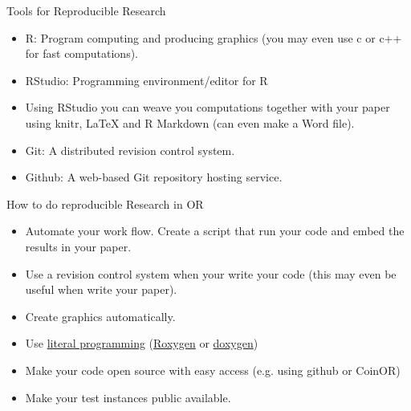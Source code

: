 \documentclass[10pt, compress]{beamer}
\begin{document}
\begin{frame}{Tools for Reproducible Research}

\begin{itemize}[<+->]
\item R: Program computing and producing graphics (you may even use c or c++ for fast computations).
\item RStudio: Programming environment/editor for R
\item Using RStudio you can weave you computations together with your paper using knitr, LaTeX and R Markdown (can even make a Word file).
\item Git: A distributed revision control system.
\item Github: A web-based Git repository hosting service.
\end{itemize}

\end{frame}



\begin{frame}{How to do reproducible Research in OR}

\begin{itemize}[<+->]
\item Automate your work flow. Create a script that run your code and embed the results in your paper. 
\item Use a revision control system when your write your code (this may even be useful when write your paper).
\item Create graphics automatically.
\item Use \href{http://en.wikipedia.org/wiki/Literate_programming}{literal programming} (\href{http://roxygen.org/}{Roxygen} or \href{http://www.doxygen.org/}{doxygen})
\item Make your code open source with easy access (e.g. using github or CoinOR)
\item Make your test instances public available.
\end{itemize}

\end{frame}
\end{document}
